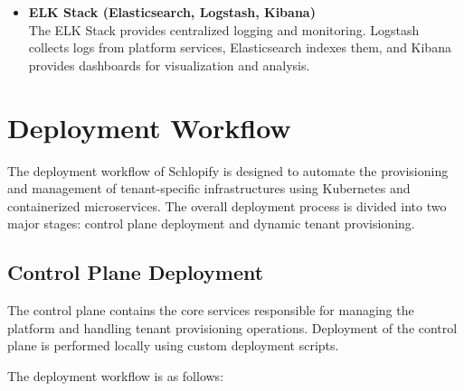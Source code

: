 \documentclass[12pt,a4paper]{report}
\begin{document}
\begin{itemize}

    \item \textbf{ELK Stack (Elasticsearch, Logstash, Kibana)} \\
    The ELK Stack provides centralized logging and monitoring. Logstash collects logs from platform services, Elasticsearch indexes them, and Kibana provides dashboards for visualization and analysis.

\end{itemize}










\newpage

\chapter{Deployment Workflow}

The deployment workflow of Schlopify is designed to automate the provisioning and management of tenant-specific infrastructures using Kubernetes and containerized microservices. The overall deployment process is divided into two major stages: control plane deployment and dynamic tenant provisioning.

\section{Control Plane Deployment}

The control plane contains the core services responsible for managing the platform and handling tenant provisioning operations. Deployment of the control plane is performed locally using custom deployment scripts.

The deployment workflow is as follows:
\end{document}
